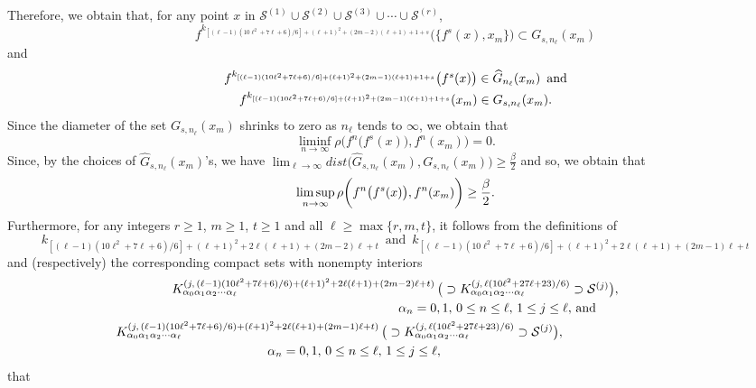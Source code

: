 \documentclass[12pt]{article}
\newcommand{\al}{\alpha}
\begin{document}
Therefore, we obtain that, for any point $x$ in $\mathcal S^{(1)} \cup \mathcal S^{(2)} \cup \mathcal S^{(3)} \cup \cdots \cup \mathcal S^{(r)}$, 
$$
f^{k_{[(\ell-1)(10\ell^2+7\ell+6)/6]+(\ell+1)^2+(2m-2)(\ell+1)+1+s}}\big(\{ f^s(x), x_m \}\big) \subset G_{s,n_\ell}(x_m)
$$
and 
\begin{multline*}
$$
f^{k_{[(\ell-1)(10\ell^2+7\ell+6)/6]+(\ell+1)^2+(2m-1)(\ell+1)+1+s}}\big(f^s(x)\big) \in \widehat G_{n_\ell}(x_m) \,\,\, \text{and} \\ f^{k_{[(\ell-1)(10\ell^2+7\ell+6)/6]+(\ell+1)^2+(2m-1)(\ell+1)+1+s}}(x_m) \in G_{s,n_\ell}(x_m).
$$
\end{multline*}
\indent Since the diameter of the set $G_{s,n_\ell}(x_m)$ shrinks to zero as $n_\ell$ tends to $\infty$, we obtain that 
$$
\liminf_{n \to \infty} \rho\bigg(f^n\big(f^s(x)\big), f^n(x_m)\bigg) = 0.
$$
\indent Since, by the choices of $\widehat G_{s,n_\ell}(x_m)$'s, we have $\lim_{\ell \to \infty} dist\big(\widehat G_{s,n_\ell}(x_m), G_{s,n_\ell}(x_m)\big) \ge \frac \beta2$ and so, we obtain that 
$$
\limsup_{n \to \infty} \rho\bigg(f^n\big(f^s(x)\big), f^n(x_m)\bigg) \ge \frac \beta2.\vspace{.1in}
$$
\indent Furthermore, for any integers $r \ge 1$, $m \ge 1$, $t \ge 1$ and all $\ell \ge \max \{ r, m, t \}$, it follows from the definitions of    
$$
k_{[(\ell-1)(10\ell^2+7\ell+6)/6]+(\ell+1)^2+2\ell(\ell+1)+(2m-2)\ell+t} \,\,\, \text{and} \,\,\, k_{[(\ell-1)(10\ell^2+7\ell+6)/6]+(\ell+1)^2+2\ell(\ell+1)+(2m-1)\ell+t}
$$ 
and (respectively) the corresponding compact sets with nonempty interiors 
\begin{multline*}
$$
K_{\al_0\al_1\al_2\cdots\al_\ell}^{(j, \, (\ell-1)(10\ell^2+7\ell+6)/6)+(\ell+1)^2+2\ell(\ell+1)+(2m-2)\ell+t)} \, \big(\supset K_{\al_0\al_1\al_2\cdots\al_\ell}^{(j, \, \ell(10\ell^2+27\ell+23)/6)} \supset \mathcal S^{(j)}\big), \\
\qquad\qquad\qquad\qquad\qquad\qquad\qquad\quad\quad\, \al_n = 0, 1, \, 0 \le n \le \ell, \, 1 \le j \le \ell, \, \text{and} \\ 
K_{\al_0\al_1\al_2\cdots\al_\ell}^{(j, \, (\ell-1)(10\ell^2+7\ell+6)/6)+(\ell+1)^2+2\ell(\ell+1)+(2m-1)\ell+t)} \, \big(\supset K_{\al_0\al_1\al_2\cdots\al_\ell}^{(j, \, \ell(10\ell^2+27\ell+23)/6)} \supset \mathcal S^{(j)}\big), \qquad\qquad\qquad\qquad\,\,\,\,\, \\
\al_n = 0, 1, \, 0 \le n \le \ell, \, 1 \le j \le \ell, \qquad\qquad\qquad\,\,\,
$$
\end{multline*}
that 
\end{document}
